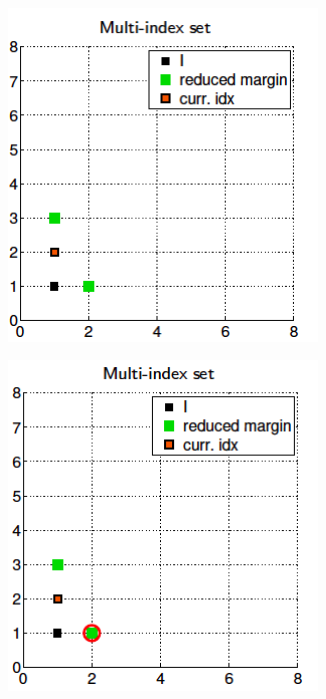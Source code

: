 \documentclass[ima, 20pt, portrait, plainboxedsections]{sciposter}
\begin{document}
\begin{multicols}{3}
\begin{figure}
\begin{subfigure}{0.3\textwidth}
		\caption{}
	\end{subfigure}\hfil
	\medskip
\begin{subfigure}{0.3\textwidth}
	\centering
	\includegraphics[width=0.9\textwidth]{./MISC_construction/4}
	\caption{}
\end{subfigure}\hfil
\begin{subfigure}{0.3\textwidth}
	\centering
	\includegraphics[width=0.9\textwidth]{./MISC_construction/5}

\end{subfigure}
\end{figure}
\end{multicols}
\end{document}
